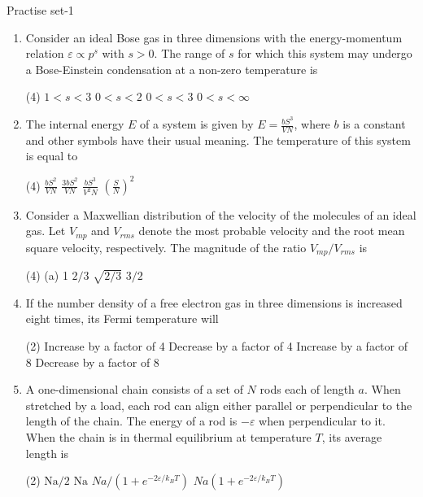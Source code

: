 \newpage
\begin{abox}
	Practise set-1
\end{abox}
\begin{enumerate}
	\item Consider an ideal Bose gas in three dimensions with the energy-momentum relation $\varepsilon \propto p^{s}$ with $s>0$. The range of $s$ for which this system may undergo a Bose-Einstein condensation at a non-zero temperature is
{}
\begin{tasks}(4)
\task[\textbf{A.}] $1<s<3$
\task[\textbf{B.}] $0<s<2$
\task[\textbf{C.}] $0<s<3$
\task[\textbf{D.}] $0<s<\infty$
\end{tasks}

\item The internal energy $E$ of a system is given by $E=\frac{b S^{3}}{V N}$, where $b$ is a constant and other symbols have their usual meaning. The temperature of this system is equal to
{}
\begin{tasks}(4)
\task[\textbf{A.}] $\frac{b S^{2}}{V N}$
\task[\textbf{B.}] $\frac{3 b S^{2}}{V N}$
\task[\textbf{C.}]  $\frac{b S^{3}}{V^{2} N}$
\task[\textbf{D.}] $\left(\frac{S}{N}\right)^{2}$
\end{tasks}

\item Consider a Maxwellian distribution of the velocity of the molecules of an ideal gas. Let $V_{m p}$ and $V_{r m s}$ denote the most probable velocity and the root mean square velocity, respectively. The magnitude of the ratio $V_{m p} / V_{r m s}$ is
{}
\begin{tasks}(4)
\task[\textbf{A.}] (a) 1
\task[\textbf{B.}] $2 / 3$
\task[\textbf{C.}] $\sqrt{2 / 3}$
\task[\textbf{D.}] $3 / 2$
\end{tasks}

\item If the number density of a free electron gas in three dimensions is increased eight times, its Fermi temperature will
{}
\begin{tasks}(2)
\task[\textbf{A.}] Increase by a factor of 4
\task[\textbf{B.}] Decrease by a factor of 4
\task[\textbf{C.}] Increase by a factor of 8
\task[\textbf{D.}] Decrease by a factor of 8
\end{tasks}

\item A one-dimensional chain consists of a set of $N$ rods each of length $a$. When stretched by a load, each rod can align either parallel or perpendicular to the length of the chain. The energy of a rod is $-\varepsilon$ when perpendicular to it. When the chain is in thermal equilibrium at temperature $T$, its average length is
{}
\begin{tasks}(2)
\task[\textbf{A.}] $\mathrm{Na} / 2$
\task[\textbf{B.}] $\mathrm{Na}$
\task[\textbf{C.}] $N a /\left(1+e^{-2 \varepsilon / k_{B} T}\right)$
\task[\textbf{D.}] $N a\left(1+e^{-2 \varepsilon / k_{B} T}\right)$
\end{tasks}


\end{enumerate}
